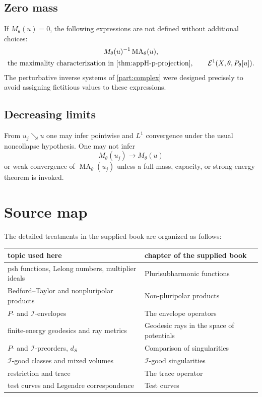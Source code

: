 \subsection*{Zero mass}
\label{sec:appH-zero-mass}

If \(M_\theta(u)=0\), the following expressions are not defined without
additional choices:
\[
\begin{gathered}
 M_\theta(u)^{-1}\operatorname{MA}_\theta(u),\\
  \text{the maximality characterization in \Cref{thm:appH-p-projection}},\qquad
 \mathcal E^1(X,\theta,P_\theta[u]).
\end{gathered}
\]
The perturbative inverse systems of \cref{part:complex} were designed precisely to
avoid assigning fictitious values to these expressions.

\subsection*{Decreasing limits}
\label{sec:appH-decreasing-limits}

From \(u_j\searrow u\) one may infer pointwise and \(L^1\) convergence under
the usual noncollapse hypothesis. One may not infer
\[
                         M_\theta(u_j)\to M_\theta(u)
\]
or weak convergence of \(\operatorname{MA}_\theta(u_j)\) unless a
full-mass, capacity, or strong-energy theorem is invoked.

\section{Source map}
\label{sec:appH-source-map}

The detailed treatments in the supplied book \cite{XiaBook} are organized
as follows:
\begin{center}
\begin{tabular}{@{}p{}p{}@{}}
\toprule
topic used here & chapter of the supplied book\\
\midrule
psh functions, Lelong numbers, multiplier ideals & Plurisubharmonic functions\\
Bedford--Taylor and nonpluripolar products & Non-pluripolar products\\
\(P\)- and \(\mathcal I\)-envelopes & The envelope operators\\
finite-energy geodesics and ray metrics & Geodesic rays in the space of potentials\\
\(P\)- and \(\mathcal I\)-preorders, \(d_S\) & Comparison of singularities\\
\(\mathcal I\)-good classes and mixed volumes & \(\mathcal I\)-good singularities\\
restriction and trace & The trace operator\\
test curves and Legendre correspondence & Test curves\\
\bottomrule
\end{tabular}
\end{center}

